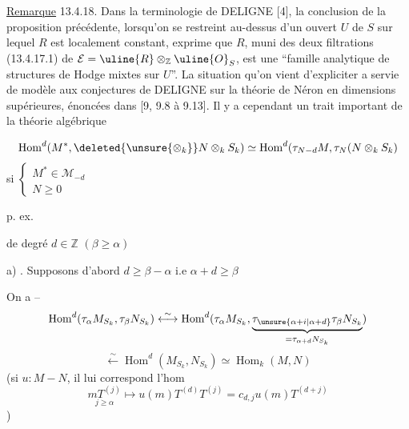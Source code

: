 \uline{Remarque} 13.4.18. Dans la terminologie de DELIGNE [4], la conclusion de la proposition précédente, lorsqu'on se restreint au-dessus d'un ouvert $U$ de $S$ sur lequel $R$ est localement constant, exprime que $R$, muni des deux filtrations (13.4.17.1) de $\mathcal E=\uline{R}\otimes_{\mathbb Z}\uline{O}_S$, est une ``famille analytique de structures de Hodge mixtes sur $U$''. La situation qu'on vient d'expliciter a servie de modèle aux conjectures de DELIGNE sur la théorie de Néron en dimensions supérieures, énoncées dans [9, 9.8 à 9.13]. Il y a cependant un trait important de la théorie algébrique

\uline{}
\[
\operatorname{Hom}^d(M^*,\deleted{\unsure{\otimes_k}}N\otimes_k S_k)\simeq\operatorname{Hom}^d(\tau_{N-d}M,\tau_N(N\otimes_k S_k)
\]
si $\left\{\begin{array}{l}M^*\in\mathcal M_{-d}\\N\geq0\end{array}\right.$

p. ex.

 de degré $d\in\mathbb Z$
 $(\beta\geq\alpha)$

a) . Supposons d'abord $\boxed{d\geq\beta-\alpha}$ i.e $\alpha+d\geq\beta$

On a  --
\[
\operatorname{Hom}^d(\tau_\alpha M_{S_k},\tau_\beta N_{S_k})\overset{\sim}{\longleftrightarrow}\operatorname{Hom}^d(\tau_\alpha M_{S_k},\underbrace{\tau_{\unsure{\alpha+i|\alpha+d}}\tau_\beta N_{S_k}}_{=\tau_{\alpha+d}N_{S_k}})
\]
\[
\overset{\sim}{\longleftarrow}\operatorname{Hom}^d(M_{S_k},N_{S_k})\simeq\operatorname{Hom}_k(M,N)
\]
(si $u:M-N$, il lui correspond l'hom
\[
\underset{j\geq\alpha}{mT^{(j)}}\longmapsto u(m)T^{(d)}T^{(j)}=c_{d,j}u(m)T^{(d+j)}
\]
)


